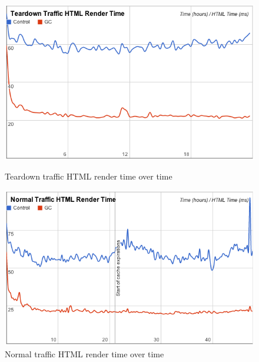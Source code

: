 \documentclass[12pt]{ucthesis}
\begin{document}
\begin{figure}[htp]
\centering
\includegraphics[width=\textwidth]{assets/teardownHTMLRenderTimeXTime.png}
\caption{Teardown traffic HTML render time over time}
\label{fig:teardownHTMLRenderTimeXTime}

\vspace{2em}
\centering
\includegraphics[width=\textwidth]{assets/normalHTMLRenderTimeXTime.png}
\caption{Normal traffic HTML render time over time}
\label{fig:normalHTMLRenderTimeXTime}
\end{figure}
\end{document}
